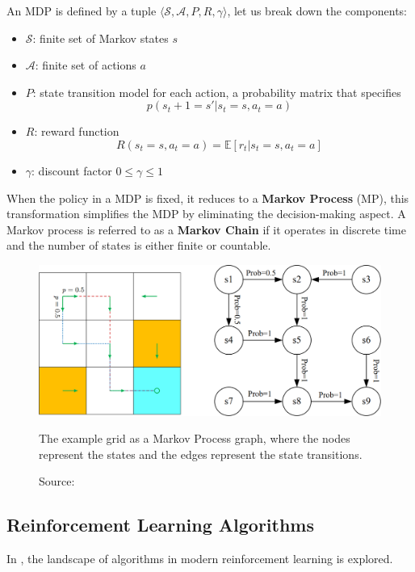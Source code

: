 \vspace{3cm}

An MDP is defined by a tuple \( \langle \mathcal{S}, \mathcal{A}, P, R, \gamma \rangle \),
let us break down the components:
\begin{itemize}
    \item \( \mathcal{S} \): finite set of Markov states $s$
    \item \( \mathcal{A} \): finite set of actions $a$
    \item \( P \): state transition model for each action,
    a probability matrix that specifies $$p(s_t+1 = s'|s_t=s, a_t=a)$$
    \item \( R \): reward function
    $$ R(s_t=s, a_t=a) = \mathbb{E} [r_t | s_t = s, a_t = a] $$
    \item \( \gamma \): discount factor $0 \leq \gamma \leq 1$
\end{itemize}

When the policy in a MDP is fixed, it reduces to a \textbf{Markov Process} (MP),
this transformation simplifies the MDP by eliminating the decision-making aspect. 
A Markov process is referred to as a \textbf{Markov Chain} if it operates in discrete
time and the number of states is either finite or countable.

\begin{figure}[h]
    \centering
    \includegraphics[width=.75\textwidth]{figures/ch3/3.mdp.png}
    \caption{The example grid as a Markov Process graph, where the nodes
    represent the states and the edges represent the state transitions.}
    \vspace{-10px}
    \caption*{\scriptsize{Source: \cite{zhao2024RLBook}}}
    \label{fig:mdp}
\end{figure}


\subsection{Reinforcement Learning Algorithms}
\label{sec:rlalg}

In \cite{openaiPartKinds}, the landscape of algorithms in modern reinforcement
learning is explored.

